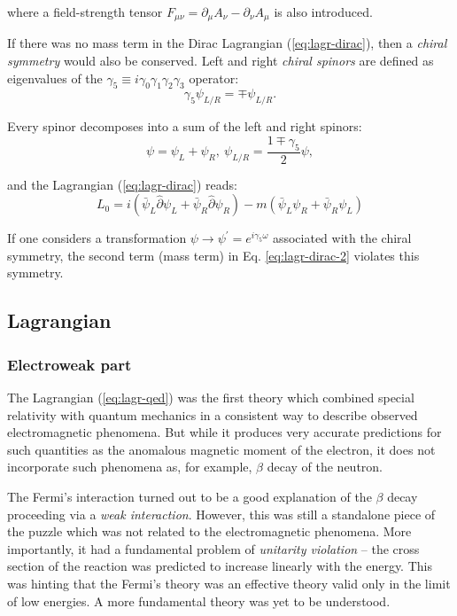 where a field-strength tensor $F_{\mu\nu} = \partial_\mu A_\nu - \partial_\nu A_\mu$ is also introduced.

If there was no mass term in the Dirac Lagrangian (\ref{eq:lagr-dirac}), then a \textit{chiral symmetry} would also be conserved. Left and right \textit{chiral spinors} are defined as eigenvalues of the $\gamma_5 \equiv i\gamma_0\gamma_1\gamma_2\gamma_3$ operator:
\begin{equation}
    \gamma_5\psi_{L/R} = \mp\psi_{L/R}.
\end{equation}

Every spinor decomposes into a sum of the left and right spinors:
\begin{equation}
    \psi = \psi_L + \psi_R, ~\psi_{L/R} = \dfrac{1\mp\gamma_5}{2}\psi,
\end{equation}

and the Lagrangian (\ref{eq:lagr-dirac}) reads:
\begin{equation}\label{eq:lagr-dirac-2}
    L_0 = i(\bar{\psi}_L\hat{\partial}\psi_L + \bar{\psi}_R\hat{\partial}\psi_R) - m(\bar{\psi}_L\psi_R + \bar{\psi}_R\psi_L)
\end{equation}

If one considers a transformation $\psi \to \psi^\prime = e^{i\gamma_5\omega}$ associated with the chiral symmetry, the second term (mass term) in Eq.  \ref{eq:lagr-dirac-2} violates this symmetry.

\subsection{Lagrangian}

\subsubsection{Electroweak part}
The Lagrangian (\ref{eq:lagr-qed}) was the first theory which combined special relativity with quantum mechanics in a consistent way to describe observed electromagnetic phenomena. But while it produces very accurate predictions for such quantities as the anomalous magnetic moment of the electron, it does not incorporate such phenomena as, for example, $\beta$ decay of the neutron.

The Fermi's interaction turned out to be a good explanation of the $\beta$ decay proceeding via a \textit{weak interaction}. However, this was still a standalone piece of the puzzle which was not related to the electromagnetic phenomena. More importantly, it had a fundamental problem of \textit{unitarity violation} -- the cross section of the reaction was predicted to increase linearly with the energy. This was hinting that the Fermi's theory was an effective theory valid only in the limit of low energies. A more fundamental theory was yet to be understood.

